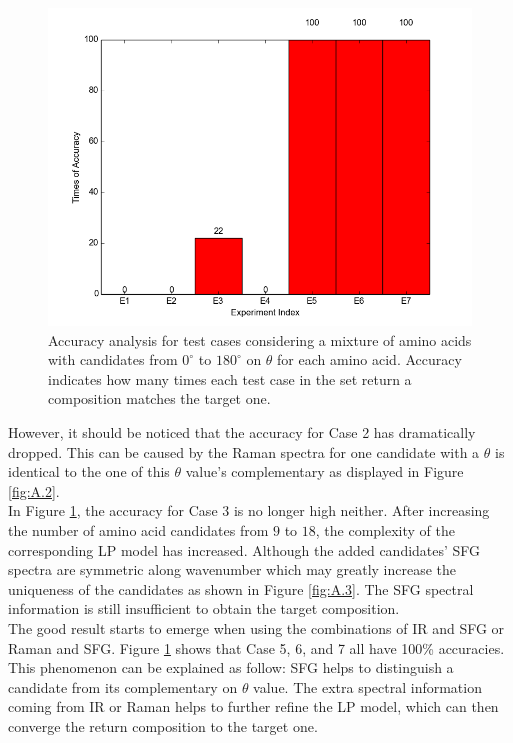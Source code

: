 \begin{figure}[!ht]
\centering
\includegraphics[scale=0.7]{Figures/accuracy_pecent_result10_mixture.png}
\caption{Accuracy analysis for test cases considering a mixture of amino acids with candidates from $0^{\circ}$ to $180^{\circ}$ on $\theta$ for each amino acid. Accuracy indicates how many times each test case in the set return a composition matches the target one.} \label{fig:5.3}
\end{figure}

However, it should be noticed that the accuracy for Case 2 has dramatically dropped. This can be caused by the Raman spectra for one candidate with a $\theta$ is identical to the one of this $\theta$ value's complementary as displayed in Figure \ref{fig:A.2}. \\

In Figure \ref{fig:5.3}, the accuracy for Case 3 is no longer high neither. After increasing the number of amino acid candidates from $9$ to $18$, the complexity of the corresponding LP model has increased. Although the added candidates' SFG spectra are symmetric along wavenumber which may greatly increase the uniqueness of the candidates as shown in Figure \ref{fig:A.3}. The SFG spectral information is still insufficient to obtain the target composition. \\

The good result starts to emerge when using the combinations of IR and SFG or Raman and SFG. Figure \ref{fig:5.3} shows that Case 5, 6, and 7 all have 100\% accuracies. This phenomenon can be explained as follow: SFG helps to distinguish a candidate from its complementary on $\theta$ value. The extra spectral information coming from IR or Raman helps to further refine the LP model, which can then converge the return composition to the target one. \\


